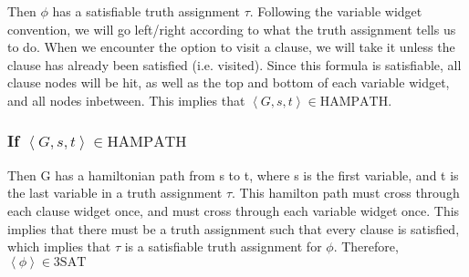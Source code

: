 Then $\phi$ has a satisfiable truth assignment $\tau$. Following the variable widget convention, we will go left/right according to what the truth assignment tells us to do. When we encounter the option to visit a clause, we will take it unless the clause has already been satisfied (i.e. visited). Since this formula is satisfiable, all clause nodes will be hit, as well as the top and bottom of each variable widget, and all nodes inbetween. This implies that $\left<G,s,t\right>\in\text{HAMPATH}$.

\subsubsection{If $\left<G,s,t\right>\in\text{HAMPATH}$}

Then G has a hamiltonian path from s to t, where s is the first variable, and t is the last variable in a truth assignment $\tau$. This hamilton path must cross through each clause widget once, and must cross through each variable widget once. This implies that there must be a truth assignment such that every clause is satisfied, which implies that $\tau$ is a satisfiable truth assignment for $\phi$. Therefore, $\left<\phi\right>\in\text{3SAT}$

